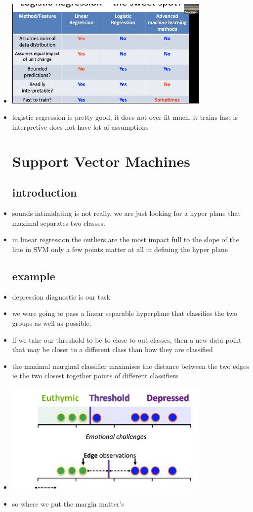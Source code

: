 \documentclass{article}
\begin{document}
\begin{itemize}
\item \includegraphics[width=10cm]{Final_Review/lecture_10/trade_off_logistic_reg.jpg}
\item logistic regression is pretty good, it does not over fit much. it trains fast is interpretive does not have  lot of assumptions 
\section{Support Vector Machines}
\subsection{introduction}
\item sounds intimidating is not really, we are just looking for a hyper plane that maximal separates two classes.
\item in linear regression the outliers are the most impact full to the slope of the line 
\itme in SVM only a few points matter at all in defining the hyper plane 
\subsection{example}
\item depression diagnostic is our task 
\item we ware going to pass a linear separable hyperplane that classifies the two groups as well as possible. 
\item if we take our threshold to be to close to out classes, then a new data point that may be closer to a different class than how they are classified 
\item the maximal marginal classifier maximises the distance between the two edges ie the two closest together points of different classifiers
\item \includegraphics[width=10cm]{Final_Review/lecture_10/margin_class.jpg}
\item so where we put the margin matter's

\end{itemize}
\end{document}

